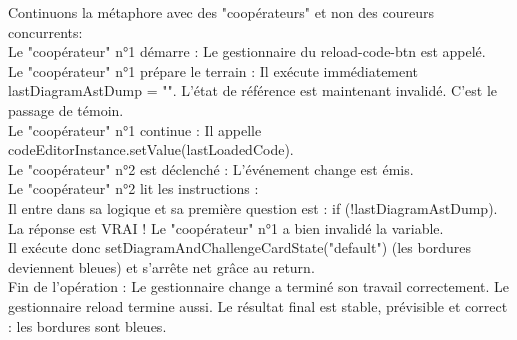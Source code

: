 \documentclass[11pt,a4paper]{article}
\begin{document}
Continuons la métaphore avec des "coopérateurs" et non des coureurs concurrents:\\
Le "coopérateur" n°1 démarre : Le gestionnaire du reload-code-btn est appelé.\\
Le "coopérateur" n°1 prépare le terrain : Il exécute immédiatement lastDiagramAstDump = "". L'état de référence est maintenant invalidé. C'est le passage de témoin.\\
Le "coopérateur" n°1 continue : Il appelle codeEditorInstance.setValue(lastLoadedCode).\\
Le "coopérateur" n°2 est déclenché : L'événement change est émis.\\
Le "coopérateur" n°2 lit les instructions :\\
Il entre dans sa logique et sa première question est : if (!lastDiagramAstDump).\\
La réponse est VRAI ! Le "coopérateur" n°1 a bien invalidé la variable.\\
Il exécute donc setDiagramAndChallengeCardState("default") (les bordures deviennent bleues) et s'arrête net grâce au return.\\
Fin de l'opération : Le gestionnaire change a terminé son travail correctement. Le gestionnaire reload termine aussi. Le résultat final est stable, prévisible et correct : les bordures sont bleues.\\
\end{document}
